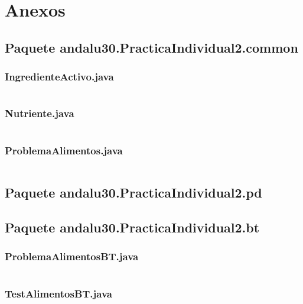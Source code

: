 \documentclass[a4paper,12pt]{article}
\begin{document}
\section{Anexos}
\subsection{Paquete andalu30.PracticaIndividual2.common}
\subsubsection{IngredienteActivo.java}
\inputminted[fontsize=\footnotesize,breaklines]{java}{src/andalu30/PracticaIndividual2/common/IngredienteActivo.java}
\subsubsection{Nutriente.java}
\inputminted[fontsize=\footnotesize,breaklines]{java}{src/andalu30/PracticaIndividual2/common/Nutriente.java}
\subsubsection{ProblemaAlimentos.java}
\inputminted[fontsize=\footnotesize,breaklines]{java}{src/andalu30/PracticaIndividual2/common/ProblemaAlimentos.java}

\subsection{Paquete andalu30.PracticaIndividual2.pd}



\subsection{Paquete andalu30.PracticaIndividual2.bt}
\subsubsection{ProblemaAlimentosBT.java}
\inputminted[fontsize=\footnotesize,breaklines]{java}{src/andalu30/PracticaIndividual2/bt/ProblemaAlimentosBT.java}
\subsubsection{TestAlimentosBT.java}
\inputminted[fontsize=\footnotesize,breaklines]{java}{src/andalu30/PracticaIndividual2/bt/TestAlimentosBT.java}
\end{document}
